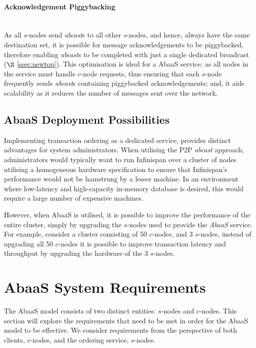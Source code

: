 	\paragraph{Acknowledgement Piggybacking} \hspace{0pt} \\
	As all $s$-nodes send \emph{abcast}s to all other $s$-nodes, and hence, always have the same destination set, it is possible for message acknowledgements to be piggybacked, therefore enabling \emph{abcast}s to be completed with just a single dedicated broadcast ($\S$ \ref{ssec:newtop}).  This optimisation is ideal for a \textsf{AbaaS} service: as all nodes in the service must handle $c$-node requests, thus ensuring that each $s$-node frequently sends \emph{abcast}s containing piggybacked acknowledgements; and, it aids scalability as it reduces the number of messages sent over the network. 
	
	\subsection{AbaaS Deployment Possibilities}
	Implementing transaction ordering as a dedicated service, provides distinct advantages for system administrators.  When utilising the P2P \emph{abcast} approach, administrators would typically want to run Infinispan over a cluster of nodes utilising a homogeneous hardware specification to ensure that Infinispan's performance would not be hamstrung by a lesser machine.  In an environment where low-latency and high-capacity in-memory database is desired, this would require a large number of expensive machines.  
	
	However, when AbaaS is utilised, it is possible to improve the performance of the entire cluster, simply by upgrading the $s$-nodes used to provide the \emph{AbaaS} service.  For example, consider a cluster consisting of 50 $c$-nodes, and 3 $s$-nodes, instead of upgrading all 50 $c$-nodes it is possible to improve transaction latency and throughput by upgrading the hardware of the 3 $s$-nodes.  
	
\section{AbaaS System Requirements}
The \textsf{AbaaS} model consists of two distinct entities: $s$-nodes and $c$-nodes.  This section will explore the requirements that need to be met in order for the \textsf{AbaaS} model to be effective.  We consider requirements from the perspective of both clients, $c$-nodes, and the ordering service, $s$-nodes.

